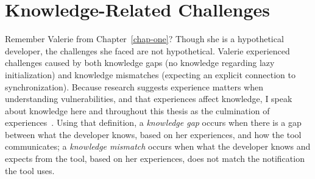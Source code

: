 
\section{Knowledge-Related Challenges}

Remember Valerie from Chapter~\ref{chap-one}? Though she is a hypothetical developer, the challenges she faced are not hypothetical. Valerie experienced challenges caused by both knowledge gaps (no knowledge regarding lazy initialization) and knowledge mismatches (expecting an explicit connection to synchronization). 
Because research suggests experience matters when understanding vulnerabilities, and that experiences affect knowledge, I speak about knowledge here and throughout this thesis as the culmination of experiences~\cite{johnson1989mental,argote2011organizational,baca2009static}.
Using that definition, a \emph{knowledge gap} occurs when there is a gap between what the developer knows, based on her experiences, and how the tool communicates; a \emph{knowledge mismatch} occurs when what the developer knows and expects from the tool, based on her experiences, does not match the notification the tool uses.


